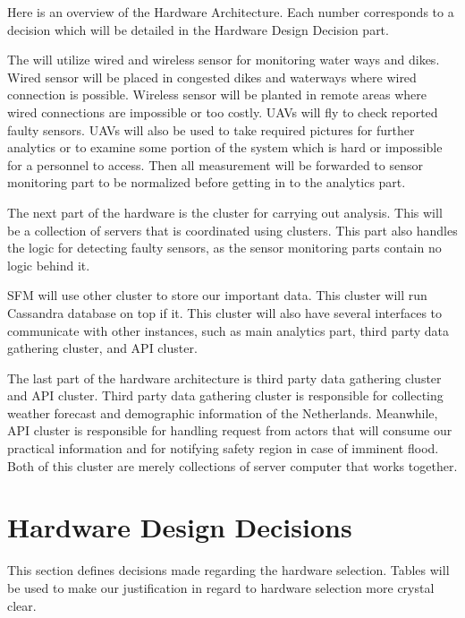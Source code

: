 Here is an overview of the Hardware Architecture. Each number corresponds to a decision which will be detailed in the Hardware Design Decision part.

The \ProjectName{} will utilize wired and wireless sensor for monitoring water ways and dikes. Wired sensor will be placed in congested dikes and waterways where wired connection is possible. Wireless sensor will be planted in remote areas where wired connections are impossible or too costly. UAVs will fly to check reported faulty sensors. UAVs will also be used to take required pictures for further analytics or to examine some portion of the system which is hard or impossible for a personnel to access. Then all measurement will be forwarded to sensor monitoring part to be normalized before getting in to the analytics part.

The next part of the hardware is the cluster for carrying out analysis. This will be a collection of servers that is coordinated using clusters. This part also handles the logic for detecting faulty sensors, as the sensor monitoring parts contain no logic behind it.

SFM will use other cluster to store our important data. This cluster will run Cassandra database on top if it. This cluster will also have several interfaces to communicate with other instances, such as main analytics part, third party data gathering cluster, and API cluster.

The last part of the hardware architecture is third party data gathering cluster and API cluster. Third party data gathering cluster is responsible for collecting weather forecast and demographic information of the Netherlands. Meanwhile, API cluster is responsible for handling request from actors that will consume our practical information and for notifying safety region in case of imminent flood. Both of this cluster are merely collections of server computer that works together.

\section{Hardware Design Decisions}
\label{sec:hardware-decisions}
This section defines decisions made regarding the hardware selection. Tables will be used to make our justification in regard to hardware selection more crystal clear.

